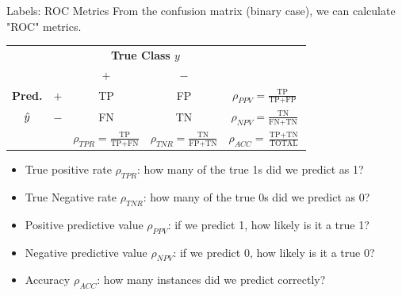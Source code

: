 \documentclass[11pt,compress,t,notes=noshow, xcolor=table]{beamer}
\begin{document}
\begin{vbframe}{Labels: ROC Metrics}
From the confusion matrix (binary case), we can calculate "ROC" metrics.



\begin{center}
\small
\renewcommand{\arraystretch}{1.5}
\begin{tabular}{cc||cc|c}
    & & \multicolumn{2}{c|}{\bfseries True Class $y$} & \\
    & & $+$ & $-$ & \\ 
    \hline \hline
    \bfseries Pred.     & $+$ & TP & FP & $\rho_{PPV} = \frac{\text{TP}}{\text{TP} + \text{FP}}$\\
              $\hat{y}$ & $-$ & FN & TN & $\rho_{NPV} = \frac{\text{TN}}{\text{FN} + \text{TN}}$\\
    \hline
    & & $\rho_{TPR} = \frac{\text{TP}}{\text{TP} + \text{FN}}$ & $\rho_{TNR} = \frac{\text{TN}}{\text{FP} + \text{TN}}$ & $\rho_{ACC} = \frac{\text{TP}+ \text{TN}}{\text{TOTAL}}$
\end{tabular}
\renewcommand{\arraystretch}{1}
\end{center}

\begin{itemize}
  \small
  \item True positive rate $\rho_{TPR}$: how many of the true 1s did we predict 
  as 1?
  \item True Negative rate $\rho_{TNR}$: how many of the true 0s did we predict 
  as 0?
  \item Positive predictive value $\rho_{PPV}$: if we predict 1, how likely is 
  it a true 1?
  \item Negative predictive value $\rho_{NPV}$: if we predict 0, how likely is 
  it a true 0?
  \item Accuracy $\rho_{ACC}$: how many instances did we predict correctly?
\end{itemize}
\end{vbframe}
\end{document}
